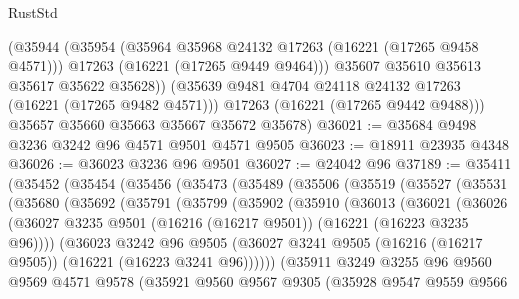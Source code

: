 \begin{lexlean}{RustStd}
\begin{coremodule}
          (@35944
            (@35954
              (@35964 @35968 @24132 @17263 (@16221 (@17265 @9458 @4571)))
              @17263
              (@16221 (@17265 @9449 @9464)))
            @35607
            @35610
            @35613
            @35617
            @35622
            @35628))
        (@35639 @9481 @4704 @24118 @24132 @17263 (@16221 (@17265 @9482 @4571)))
        @17263
        (@16221 (@17265 @9442 @9488)))
      @35657
      @35660
      @35663
      @35667
      @35672
      @35678)
@36021 := @35684 @9498 @3236 @3242 @96 @4571 @9501 @4571 @9505
@36023 := @18911 @23935 @4348
@36026 := @36023 @3236 @96 @9501
@36027 := @24042 @96
@37189 := @35411
    (@35452
      (@35454
        (@35456
          (@35473
            (@35489
              (@35506
                (@35519
                  (@35527
                    (@35531
                      (@35680
                        (@35692
                          (@35791
                            (@35799
                              (@35902
                                (@35910
                                  (@36013
                                    (@36021
                                      (@36026
                                        (@36027
                                          @3235
                                          @9501
                                          (@16216 (@16217 @9501))
                                          (@16221 (@16223 @3235 @96))))
                                      (@36023
                                        @3242
                                        @96
                                        @9505
                                        (@36027
                                          @3241
                                          @9505
                                          (@16216 (@16217 @9505))
                                          (@16221 (@16223 @3241 @96))))))
                                  (@35911
                                    @3249
                                    @3255
                                    @96
                                    @9560
                                    @9569
                                    @4571
                                    @9578
                                    (@35921
                                      @9560
                                      @9567
                                      @9305
                                      (@35928
                                        @9547
                                        @9559
                                        @9566

\end{coremodule}
\end{lexlean}
